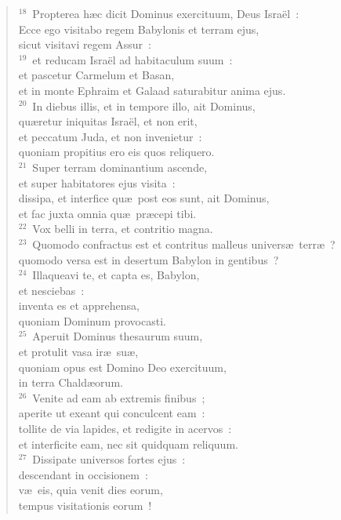 \begin{verse}
${}^{18}$~Propterea h\ae c dicit Dominus exercituum, Deus Isra\"el~:\\ Ecce ego visitabo regem Babylonis et terram ejus,\\ sicut visitavi regem Assur~:\\
${}^{19}$~et reducam Isra\"el ad habitaculum suum~:\\ et pascetur Carmelum et Basan,\\ et in monte Ephraim et Galaad saturabitur anima ejus.\\
${}^{20}$~In diebus illis, et in tempore illo, ait Dominus,\\ qu\ae retur iniquitas Isra\"el, et non erit,\\ et peccatum Juda, et non invenietur~:\\ quoniam propitius ero eis quos reliquero.\\
${}^{21}$~Super terram dominantium ascende,\\ et super habitatores ejus visita~:\\ dissipa, et interfice qu\ae\ post eos sunt, ait Dominus,\\ et fac juxta omnia qu\ae\ pr\ae cepi tibi.\\
${}^{22}$~Vox belli in terra, et contritio magna.\\
${}^{23}$~Quomodo confractus est et contritus malleus univers\ae\ terr\ae~?\\ quomodo versa est in desertum Babylon in gentibus~?\\
${}^{24}$~Illaqueavi te, et capta es, Babylon,\\ et nesciebas~:\\ inventa es et apprehensa,\\ quoniam Dominum provocasti.\\
${}^{25}$~Aperuit Dominus thesaurum suum,\\ et protulit vasa ir\ae\ su\ae ,\\ quoniam opus est Domino Deo exercituum,\\ in terra Chald\ae orum.\\
${}^{26}$~Venite ad eam ab extremis finibus~;\\ aperite ut exeant qui conculcent eam~:\\ tollite de via lapides, et redigite in acervos~:\\ et interficite eam, nec sit quidquam reliquum.\\
${}^{27}$~Dissipate universos fortes ejus~:\\ descendant in occisionem~:\\ v\ae\ eis, quia venit dies eorum,\\ tempus visitationis eorum~!\\

\end{verse}
